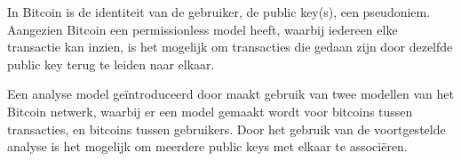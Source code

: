 In Bitcoin is de identiteit van de gebruiker, de public key(s), een pseudoniem. Aangezien Bitcoin een permissionless model heeft, waarbij iedereen elke transactie kan inzien, is het mogelijk om transacties die gedaan zijn door dezelfde public key terug te leiden naar elkaar.

Een analyse model geïntroduceerd door \cite{reid2013analysis} maakt gebruik van twee modellen van het Bitcoin netwerk, waarbij er een model gemaakt wordt voor bitcoins tussen transacties, en bitcoins tussen gebruikers. Door het gebruik van de voortgestelde analyse is het mogelijk om meerdere public keys met elkaar te associëren. 

